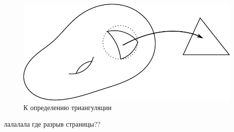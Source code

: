 \begin{figure}[H]
    \centering
    \includegraphics[scale=1]{images/c10.1.pdf}
    \caption{К определению триангуляции}
    \label{fig:c10.1}
\end{figure}
лалалала где разрыв страницы??